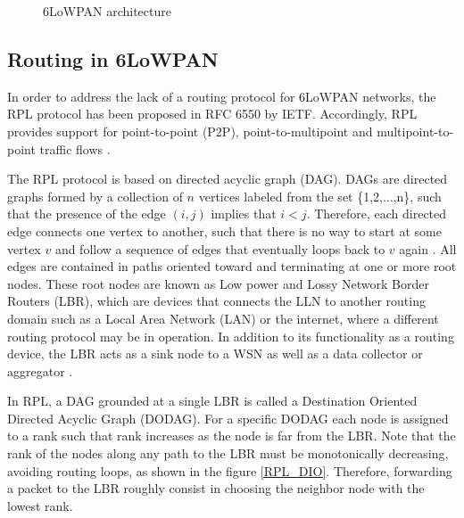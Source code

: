\documentclass[authoryear,preprint,review,12pt]{elsarticle}
\begin{document}
\begin{figure}
\centering
{}
\caption{6LoWPAN architecture}
\label{stack_6lowpan}
\end{figure}

\subsection{Routing in 6LoWPAN}
In order to address the lack of a routing protocol for 6LoWPAN networks, the RPL protocol has been proposed in RFC 6550 by IETF. Accordingly, RPL provides support for point-to-point (P2P), point-to-multipoint and multipoint-to-point traffic flows \citep{RFC6550}.

The RPL protocol is based on directed acyclic graph (DAG). DAGs are directed graphs formed by a collection of $n$ vertices labeled from the set \{1,2,...,n\}, such that the presence of the edge $(i,j)$ implies that $i < j$. Therefore, each directed edge connects one vertex to another, such that there is no way to start at some vertex $v$ and follow a sequence of edges that eventually loops back to $v$ again \citep{DAGS_1992}. All edges are contained in paths oriented toward and terminating at one or more root nodes. These root nodes are known as Low power and Lossy Network Border Routers (LBR), which are devices that connects the LLN to another routing domain such as a Local Area Network (LAN) or the internet, where a different routing protocol may be in operation. In addition to its functionality as a routing device, the LBR acts as a sink node to a WSN as well as a data collector or aggregator \citep{RFC7102}.

In RPL, a DAG grounded at a single LBR is called a Destination Oriented Directed Acyclic Graph (DODAG). For a specific DODAG each node is assigned to a rank such that rank increases as the node is far from the LBR. Note that the rank of the nodes along any path to the LBR must be monotonically decreasing, avoiding routing loops, as shown in the figure \ref{RPL_DIO}. Therefore, forwarding a packet to the LBR roughly consist in choosing the neighbor node with the lowest rank.
\end{document}
